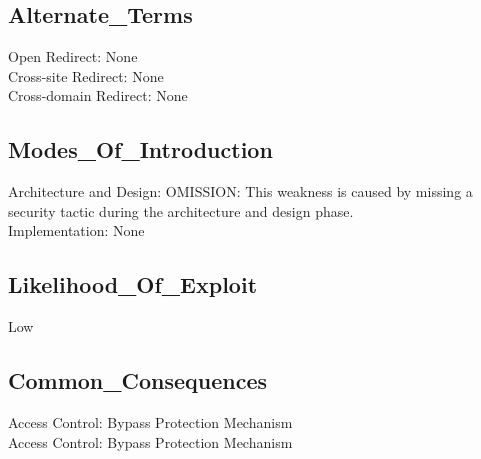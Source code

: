 \subsection*{Alternate\_Terms}
Open Redirect: None\\
Cross-site Redirect: None\\
Cross-domain Redirect: None\\
\subsection*{Modes\_Of\_Introduction}
Architecture and Design: OMISSION: This weakness is caused by missing a security tactic during the architecture and design phase.\\
Implementation: None\\
\subsection*{Likelihood\_Of\_Exploit}
Low

\subsection*{Common\_Consequences}
Access Control: Bypass Protection Mechanism\\
Access Control: Bypass Protection Mechanism\\
